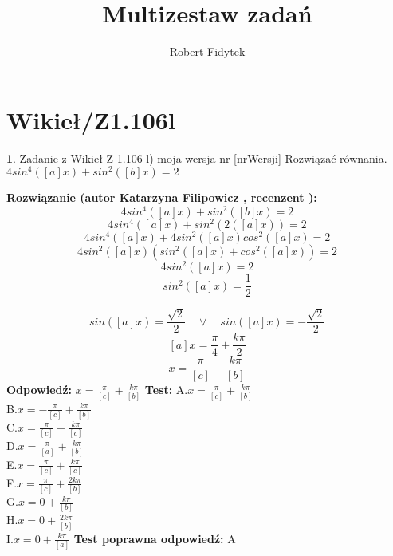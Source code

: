 \documentclass[12pt, a4paper]{article}
\title{Multizestaw zadań}
\author{Robert Fidytek}
\date{}
\theoremstyle{definition} %
\newtheorem{zad}{}
\newcommand{\kategoria}[1]{\section{#1}} %
\newcommand{\zadStart}[1]{\begin{zad}#1\newline} %
\newcommand{\zadStop}{\end{zad}}   %
\newcommand{\rozwStart}[2]{\noindent \textbf{Rozwiązanie (autor #1 , recenzent #2): }\newline} %
\newcommand{\rozwStop}{\newline}                                            %
\newcommand{\odpStart}{\noindent \textbf{Odpowiedź:}\newline}    %
\newcommand{\odpStop}{\newline}                                             %
\newcommand{\testStart}{\noindent \textbf{Test:}\newline} %
\newcommand{\testStop}{\newline} %
\newcommand{\kluczStart}{\noindent \textbf{Test poprawna odpowiedź:}\newline} %
\newcommand{\kluczStop}{\newline} %
\begin{document}
\maketitle


\kategoria{Wikieł/Z1.106l}
\zadStart{Zadanie z Wikieł Z 1.106 l) moja wersja nr [nrWersji]}
Rozwiązać równania.\\
 $4sin^4([a]x)+sin^2([b]x)=2$
\zadStop
\rozwStart{Katarzyna Filipowicz}{}
$$4sin^4([a]x)+sin^2([b]x)=2$$
$$
4sin^4([a]x)+sin^2(2([a]x))=2
$$ $$
4sin^4([a]x)+4sin^2([a]x)cos^2([a]x)=2
$$ $$
4sin^2([a]x)(sin^2([a]x)+cos^2([a]x))=2
$$ $$
4sin^2([a]x)=2
$$ $$
sin^2([a]x)=\frac{1}{2}
$$

 $$
sin([a]x)=\frac{\sqrt{2}}{2}\quad \vee \quad sin([a]x)=-\frac{\sqrt{2}}{2}
$$ $$
[a]x=\frac{\pi}{4}+\frac{k\pi}{2}
$$ $$
x=\frac{\pi}{[c]}+\frac{k\pi}{[b]}
$$
\rozwStop
\odpStart
$x=\frac{\pi}{[c]}+\frac{k\pi}{[b]}$
\odpStop
\testStart
A.$x=\frac{\pi}{[c]}+\frac{k\pi}{[b]}$\\
B.$x=-\frac{\pi}{[c]}+\frac{k\pi}{[b]}$\\
C.$x=\frac{\pi}{[c]}+\frac{k\pi}{[c]}$\\
D.$x=\frac{\pi}{[a]}+\frac{k\pi}{[b]}$\\
E.$x=\frac{\pi}{[c]}+\frac{k\pi}{[c]}$\\
F.$x=\frac{\pi}{[c]}+\frac{2k\pi}{[b]}$\\
G.$x=0+\frac{k\pi}{[b]}$\\
H.$x=0+\frac{2k\pi}{[b]}$\\
I.$x=0+\frac{k\pi}{[a]}$
\testStop
\kluczStart
A
\kluczStop
\end{document}
